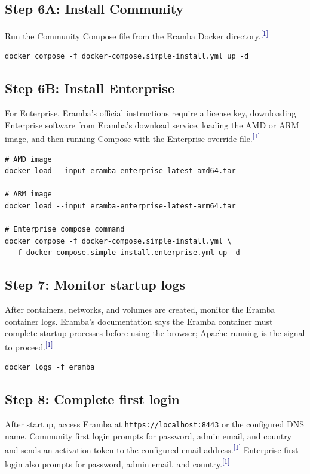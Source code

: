 \documentclass[10pt,letterpaper]{article}
\newcommand{\source}[1]{\textsuperscript{\textcolor{navy}{#1}}}
\begin{document}
\subsection{Step 6A: Install Community}
Run the Community Compose file from the Eramba Docker directory.\source{[1]}

\begin{verbatim}
docker compose -f docker-compose.simple-install.yml up -d
\end{verbatim}

\subsection{Step 6B: Install Enterprise}
For Enterprise, Eramba's official instructions require a license key, downloading Enterprise software from Eramba's download service, loading the AMD or ARM image, and then running Compose with the Enterprise override file.\source{[1]}

\begin{verbatim}
# AMD image
docker load --input eramba-enterprise-latest-amd64.tar

# ARM image
docker load --input eramba-enterprise-latest-arm64.tar

# Enterprise compose command
docker compose -f docker-compose.simple-install.yml \
  -f docker-compose.simple-install.enterprise.yml up -d
\end{verbatim}

\subsection{Step 7: Monitor startup logs}
After containers, networks, and volumes are created, monitor the Eramba container logs. Eramba's documentation says the Eramba container must complete startup processes before using the browser; Apache running is the signal to proceed.\source{[1]}

\begin{verbatim}
docker logs -f eramba
\end{verbatim}

\subsection{Step 8: Complete first login}
After startup, access Eramba at \texttt{https://localhost:8443} or the configured DNS name. Community first login prompts for password, admin email, and country and sends an activation token to the configured email address.\source{[1]} Enterprise first login also prompts for password, admin email, and country.\source{[1]}
\end{document}

